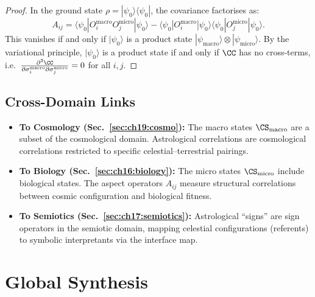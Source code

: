 \begin{proof}
In the ground state $\rho = |\psi_0\rangle\langle\psi_0|$, the
covariance factorises as:
\[
  A_{ij} = \langle\psi_0| O_i^{\mathrm{macro}} O_j^{\mathrm{micro}} |\psi_0\rangle
  - \langle\psi_0| O_i^{\mathrm{macro}} |\psi_0\rangle
    \langle\psi_0| O_j^{\mathrm{micro}} |\psi_0\rangle.
\]
This vanishes if and only if $|\psi_0\rangle$ is a product state
$|\psi_{\mathrm{macro}}\rangle \otimes |\psi_{\mathrm{micro}}\rangle$.
By the variational principle, $|\psi_0\rangle$ is a product state if
and only if $\CC$ has no cross-terms, i.e.\
$\frac{\partial^2 \CC}{\partial \sigma_i^{\mathrm{macro}}
\partial \sigma_j^{\mathrm{micro}}} = 0$ for all $i, j$.
\end{proof}

\subsection{Cross-Domain Links}

\begin{itemize}
  \item \textbf{To Cosmology (Sec.~\ref{sec:ch19:cosmo}):}
        The macro states $\CS_{\mathrm{macro}}$ are a subset of the
        cosmological domain.  Astrological correlations are
        cosmological correlations restricted to specific
        celestial--terrestrial pairings.
  \item \textbf{To Biology (Sec.~\ref{sec:ch16:biology}):}
        The micro states $\CS_{\mathrm{micro}}$ include biological
        states.  The aspect operators $A_{ij}$ measure structural
        correlations between cosmic configuration and biological
        fitness.
  \item \textbf{To Semiotics (Sec.~\ref{sec:ch17:semiotics}):}
        Astrological ``signs'' are sign operators in the semiotic
        domain, mapping celestial configurations (referents) to
        symbolic interpretants via the interface map.
\end{itemize}

\section{Global Synthesis}
\label{sec:ch19:synthesis}


